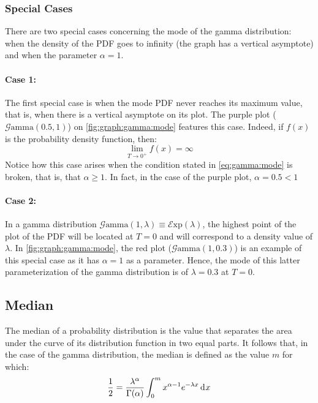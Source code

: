 \documentclass[12pt]{article}
\newcommand{\E}{\mathcal{E}}
\newcommand{\G}{\mathcal{G}}
\begin{document}
\subsubsection{Special Cases}
There are two special cases concerning the mode of the gamma distribution: when the density of the PDF goes to infinity
(the graph has a vertical asymptote) and when the parameter $\alpha=1$.

\paragraph{Case 1:}
The first special case is when the mode PDF never reaches its maximum value, that is, when there is a vertical asymptote
on its plot. The purple plot ($\G\text{amma}(0.5, 1)$) on \autoref{fig:graph:gamma:mode} features this case. Indeed, if
$f(x)$ is the probability density function, then:
\begin{equation}
	\lim_{T\to 0^+}f(x)=\infty
\end{equation}
Notice how this case arises when the condition stated in \autoref{eq:gamma:mode} is broken, that is, that $\alpha\geq
1$. In fact, in the case of the purple plot, $\alpha=0.5<1$
\paragraph{Case 2:}
In a gamma distribution $\G\text{amma}(1, \lambda)\equiv\E\text{xp}(\lambda)$, the highest point of the plot of the PDF
will be located at $T=0$ and will correspond to a density value of $\lambda$. In \autoref{fig:graph:gamma:mode}, the red
plot ($\G\text{amma}(1, 0.3)$) is an example of this special case as it has $\alpha=1$ as a parameter. Hence, the mode
of this latter parameterization of the gamma distribution is of $\lambda=0.3$ at $T=0$.


\pagebreak
\subsection{Median}
The median of a probability distribution is the value that separates the area under the curve of its distribution
function in two equal parts. It follows that, in the case of the gamma distribution, the median is defined as the value
$m$ for which:
\begin{equation}
	\frac{1}{2} = \frac{\lambda^\alpha}{\Gamma(\alpha)} \int^m_0 x^{\alpha-1} e^{-\lambda x}\mathop{}\!\mathrm{d^{}}x
\end{equation}
\end{document}
